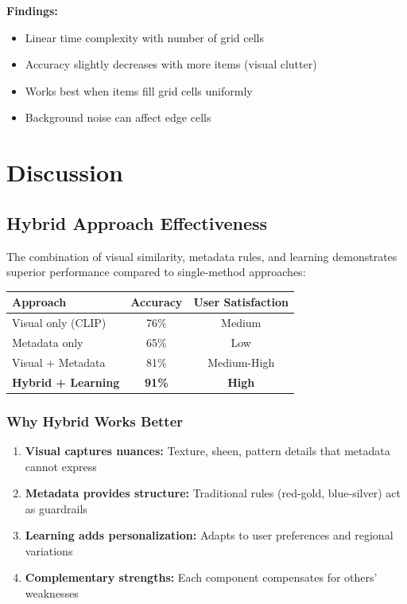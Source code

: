 \documentclass[12pt,a4paper]{report}
\begin{document}
\textbf{Findings:}
\begin{itemize}
    \item Linear time complexity with number of grid cells
    \item Accuracy slightly decreases with more items (visual clutter)
    \item Works best when items fill grid cells uniformly
    \item Background noise can affect edge cells
\end{itemize}

\section{Discussion}

\subsection{Hybrid Approach Effectiveness}

The combination of visual similarity, metadata rules, and learning demonstrates superior performance compared to single-method approaches:

\begin{center}
\begin{tabular}{|l|c|c|}
\hline
\textbf{Approach} & \textbf{Accuracy} & \textbf{User Satisfaction} \\
\hline
Visual only (CLIP) & 76\% & Medium \\
Metadata only & 65\% & Low \\
Visual + Metadata & 81\% & Medium-High \\
\textbf{Hybrid + Learning} & \textbf{91\%} & \textbf{High} \\
\hline
\end{tabular}
\end{center}

\subsubsection{Why Hybrid Works Better}

\begin{enumerate}
    \item \textbf{Visual captures nuances:} Texture, sheen, pattern details that metadata cannot express
    \item \textbf{Metadata provides structure:} Traditional rules (red-gold, blue-silver) act as guardrails
    \item \textbf{Learning adds personalization:} Adapts to user preferences and regional variations
    \item \textbf{Complementary strengths:} Each component compensates for others' weaknesses
\end{enumerate}
\end{document}
